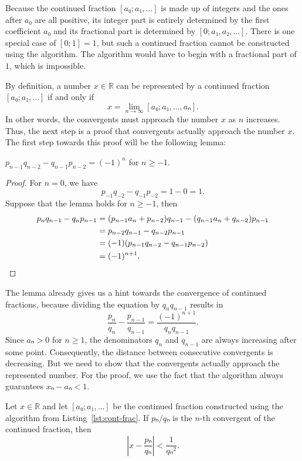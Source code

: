 Because the continued fraction $[a₀; a₁, …]$ is made up of integers and the
ones after $a₀$ are all positive, its integer part is entirely determined by
the first coefficient $a₀$ and its fractional part is determined by $[0; a₁, a₂, …]$.
There is one special case of $[0; 1] = 1$,
but such a continued fraction cannot be constructed using the algorithm.
The algorithm would have to begin with a fractional part of $1$, which is impossible.

By definition,
a number $x ∈ ℝ$ can be represented by a continued fraction $[a₀; a₁, …]$
if and only if
\[
  x = \lim_{n → ∞} [a₀; a₁, …, aₙ].
\]
In other words, the convergents must approach the number $x$ as $n$ increases.
Thus, the next step is a proof that convergents actually approach the number $x$.
The first step towards this proof will be the following lemma:

\begin{lemma}
  \label{lem:cf-det}
  $p_{n-1} q_{n-2} - q_{n-1} p_{n-2} = (-1)^n$ for $n ≥ -1$.
\end{lemma}

\begin{proof}
  For $n = 0$, we have
  \[
    p_{-1} q_{-2} - q_{-1} p_{-2} = 1 - 0 = 1.
  \]
  Suppose that the lemma holds for $n ≥ -1$, then
  \begin{align*}
    p_n q_{n-1} - q_n p_{n-1}
    & = (p_{n-1} a_n + p_{n-2}) q_{n-1} - (q_{n-1} a_n + q_{n-2}) p_{n-1} \\
    & = p_{n-2} q_{n-1} - q_{n-2} p_{n-1} \\
    & = (-1) (p_{n-1} q_{n-2} - q_{n-1} p_{n-2}) \\
    & = (-1)^{n+1}. \qedhere
  \end{align*}
\end{proof}

The lemma already gives us a hint towards the convergence of continued fractions,
because dividing the equation by $q_n q_{n-1}$ results in
\[
  \frac{p_n}{q_n} - \frac{p_{n-1}}{q_{n-1}} = \frac{(-1)^{n+1}}{q_n q_{n-1}}.
\]
Since $aₙ > 0$ for $n ≥ 1$, the denominators $q_n$ and $q_{n-1}$ are always
increasing after some point.
Consequently, the distance between consecutive convergents is decreasing.
But we need to show that the convergents actually approach the represented number.
For the proof, we use the fact that the algorithm always guarantees $xₙ - aₙ < 1$.

\begin{lemma}
  \label{lem:cf-approx}
  Let $x ∈ ℝ$ and let $[a₀; a₁, …]$ be the continued fraction constructed using the algorithm from Listing~\ref{lst:cont-frac}.
  If $pₙ/qₙ$ is the $n$-th convergent of the continued fraction, then
  \[
    \left| x - \frac{pₙ}{qₙ} \right| < \frac{1}{qₙ^2}.
  \]
\end{lemma}

